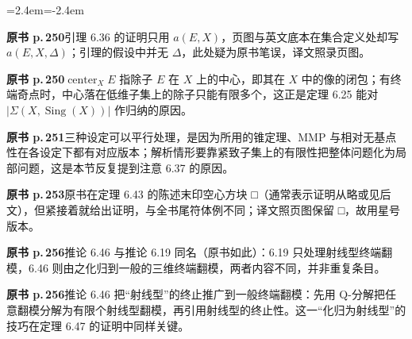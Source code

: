 \begin{list}{}{\leftmargin=2.4em\itemindent=-2.4em\itemsep=2pt\parsep=0pt}
\item \textbf{原书 p.\,250}\quad 引理 6.36 的证明只用 $a(E,X)$，页图与英文底本在集合定义处却写 $a(E,X,\Delta)$；引理的假设中并无 $\Delta$，此处疑为原书笔误，译文照录页图。
\item \textbf{原书 p.\,250}\quad $\operatorname{center}_X E$ 指除子 $E$ 在 $X$ 上的中心，即其在 $X$ 中的像的闭包；有终端奇点时，中心落在低维子集上的除子只能有限多个，这正是定理 6.25 能对 $|\Sigma(X,\operatorname{Sing}(X))|$ 作归纳的原因。
\item \textbf{原书 p.\,251}\quad 三种设定可以平行处理，是因为所用的锥定理、MMP 与相对无基点性在各设定下都有对应版本；解析情形要靠紧致子集上的有限性把整体问题化为局部问题，这是本节反复提到注意 6.37 的原因。
\item \textbf{原书 p.\,253}\quad 原书在定理 6.43 的陈述末印空心方块 □（通常表示证明从略或见后文），但紧接着就给出证明，与全书尾符体例不同；译文照页图保留 □，故用星号版本。
\item \textbf{原书 p.\,256}\quad 推论 6.46 与推论 6.19 同名（原书如此）：6.19 只处理射线型终端翻模，6.46 则由之化归到一般的三维终端翻模，两者内容不同，并非重复条目。
\item \textbf{原书 p.\,256}\quad 推论 6.46 把“射线型”的终止推广到一般终端翻模：先用 Q-分解把任意翻模分解为有限个射线型翻模，再引用射线型的终止性。这一“化归为射线型”的技巧在定理 6.47 的证明中同样关键。
\end{list}


